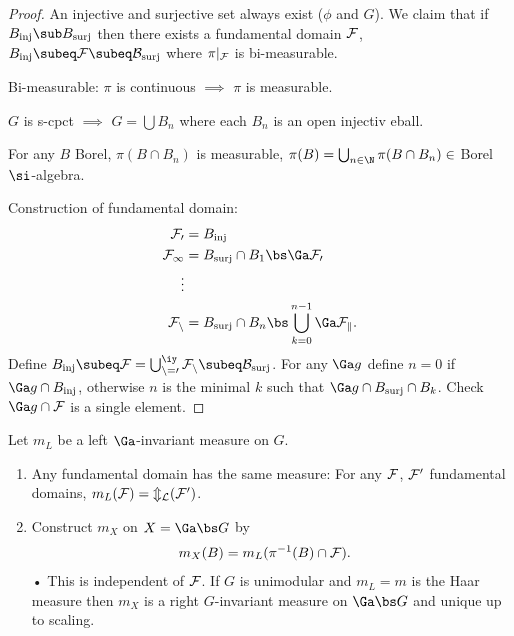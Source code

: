 \begin{proof}
An injective and surjective set always exist ($\phi$ and $G$). We claim that if $B_{\text{inj}}\sub B_{\text{surj}}$ then there exists a fundamental domain $\cal F$, $B_{\text{inj}}\subeq \cal F \subeq B_{\text{surj}}$ where $\pi|_{\cal F}$ is bi-measurable. 

Bi-measurable: $\pi$ is continuous $\implies $ $\pi$ is measurable. 

$G$ is s-cpct $\implies$ $G=\bigcup B_n$ where each $B_n$ is an open injectiv eball.

For any $B$ Borel, $\pi(B\cap B_n)$ is measurable, $\pi(B) = \bigcup_{n\in \N} \pi(B\cap B_n)\in $ Borel $\si$-algebra.

Construction of fundamental domain: 
\begin{align}
\cal F_0 &= B_{\text{inj}}\\
\cal F_1 &= B_{\text{surj}} \cap B_1 \bs \Ga \cal F_0\\
\vdots &\\
\cal F_n &= B_{\text{surj}} \cap B_n \bs \bigcup_{k=0}^{n-1} \Ga \cal F_k.
\end{align}
Define $B_{\text{inj}}\subeq \cal F = \bigcup_{n=0}^\iy \cal F_n \subeq B_{\text{surj}}$. For any $\Ga g$ define $n=0$ if $\Ga g\cap B_{{\text{inj}}}$, otherwise $n$ is the minimal $k$ such that $\Ga g \cap B_{\text{surj}} \cap B_k$. Check $\Ga g\cap \cal F$ is a single element. 
\end{proof}
\begin{pr}

\end{pr}
Let $m_L$ be a left $\Ga$-invariant measure on $G$. 
\begin{enumerate}
\item
Any fundamental domain has the same measure: 
For any $\cal F$, $\cal F'$ fundamental domains, $m_L(\cal F)=m_L(\cal F')$.
\item
Construct $m_X$ on $X=\Ga\bs G$ by 
\begin{align}
m_X(B) & = m_L (\pi^{-1} (B)\cap \cal F).
\end{align}•
This is independent of $\cal F$. 
If $G$ is unimodular and $m_L=m$ is the Haar measure then $m_X$ is a right $G$-invariant measure on $\Ga\bs G$ and unique up to scaling.
\end{enumerate}
